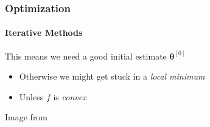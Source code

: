 \documentclass[xetex,professionalfont]{beamer}
\newcommand{\bth}{\boldsymbol{\theta}}
\begin{document}

\begin{frame}[fragile]
\frametitle{Optimization}
\framesubtitle{Iterative Methods}

This means we need a good initial estimate $\bth^{[0]}$
\begin{itemize}
    \item Otherwise we might get stuck in a \emph{local minimum} %
    \item Unless $f$ is \emph{convex} %
\end{itemize}

\begin{center}
    {\centering Image from \cite{prince12}}
\end{center}

\end{frame}

\end{document}

